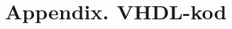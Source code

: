 \documentclass[main.tex]{subfiles}
\begin{document}
\appendix
\section{Appendix. VHDL-kod}


\end{document}
